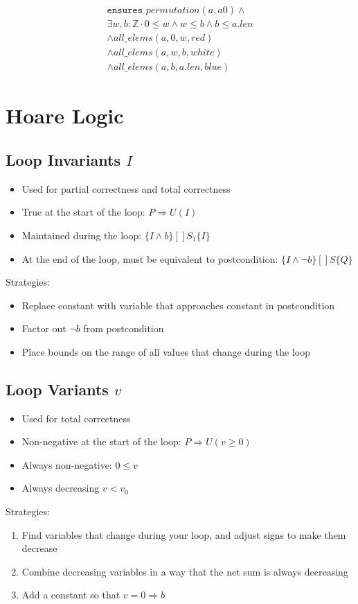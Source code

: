 \documentclass[landscape]{cheat}
\begin{document}
\begin{multicols*}{3}
\begin{multline*}
\texttt{ensures } permutation(a, a0) \land \\
    \exists w, b : \mathbb{Z} \cdot 0 \leq w \land w \leq b \land b \leq a.len \\
    \land all\_elems(a, 0, w, red) \\
    \land all\_elems(a, w, b, white) \\
    \land all\_elems(a, b, a.len, blue)
\end{multline*}

\section{Hoare Logic}

\subsection{Loop Invariants $I$}
\begin{itemize}
    \item Used for partial correctness and total correctness
    \item True at the start of the loop: $P \Rightarrow U(I)$
    \item Maintained during the loop: $\{I \land b\}[]S_1\{I\}$
    \item At the end of the loop, must be equivalent to postcondition: $\{I \land \lnot b \}[]S\{Q\}$
\end{itemize}
Strategies:
\begin{itemize}
    \item Replace constant with variable that approaches constant in postcondition 
    \item Factor out $\lnot b$ from postcondition
    \item Place bounds on the range of all values that change during the loop
\end{itemize}

\subsection{Loop Variants $v$}
\begin{itemize}
    \item Used for total correctness
    \item Non-negative at the start of the loop: $P \Rightarrow U(v \geq 0)$
    \item Always non-negative: $0 \leq v$
    \item Always decreasing $v < v_0$
\end{itemize}
Strategies:
\begin{enumerate}
    \item Find variables that change during your loop, and adjust signs to make them decrease
    \item Combine decreasing variables in a way that the net sum is always decreasing
    \item Add a constant so that $v = 0 \Rightarrow b$
\end{enumerate}


\end{multicols*}
\end{document}
